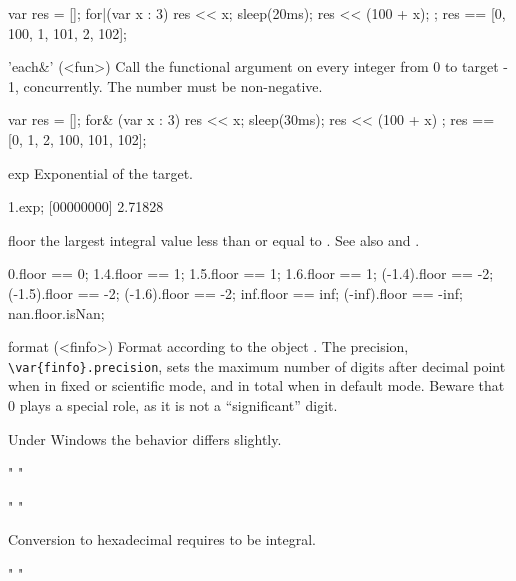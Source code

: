 \begin{urbiscriptapi}
\begin{urbiassert}
{
  var res = [];
  for|(var x : 3) { res << x; sleep(20ms); res << (100 + x); };
  res
}
== [0, 100, 1, 101, 2, 102];
\end{urbiassert}%

\item['each&'](<fun>)%
  Call the functional argument  on every integer from 0 to
  target - 1, concurrently.  The number must be non-negative.
\begin{urbiassert}
{
  var res = [];
  for& (var x : 3) { res << x; sleep(30ms); res << (100 + x) };
  res
}
== [0, 1, 2, 100, 101, 102];
\end{urbiassert}%

\item[exp]
  Exponential of the target.
\begin{urbiscript}
1.exp;
[00000000] 2.71828
\end{urbiscript}


\item[floor] the largest integral value less than or equal to \this.  See
  also  and .
\begin{urbiassert}
     0.floor ==  0;
   1.4.floor ==  1;     1.5.floor ==  1;    1.6.floor ==  1;
(-1.4).floor == -2;  (-1.5).floor == -2; (-1.6).floor == -2;
   inf.floor == inf; (-inf).floor == -inf;
   nan.floor.isNan;
\end{urbiassert}


\item[format](<finfo>)%
  Format according to the  object .
  The precision, \lstinline|\var{finfo}.precision|, sets the maximum
  number of digits after decimal point when in fixed or scientific
  mode, and in total when in default mode.  Beware that 0 plays a
  special role, as it is not a ``significant'' digit.

  \begin{windows}
    Under Windows the behavior differs slightly.
  \end{windows}
\begin{urbiassert}
"%
"%

"%
"%
\end{urbiassert}

  Conversion to hexadecimal requires \this to be integral.
\begin{urbiassert}
"%
"%


\end{urbiassert}
\end{urbiscriptapi}

